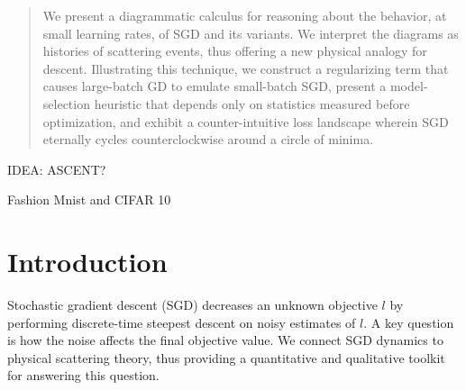 \documentclass{article}
\begin{document}


\printAffiliationsAndNotice{}


\begin{abstract}
    We present a diagrammatic calculus for reasoning about the behavior, at
    small learning rates, of SGD and its variants.  We interpret the diagrams
    as histories of scattering events, thus offering a new physical analogy for
    descent.  Illustrating this technique, we construct a regularizing term
    that causes large-batch GD to emulate small-batch SGD, present a
    model-selection heuristic that depends only on statistics measured before
    optimization, and exhibit a counter-intuitive loss landscape wherein SGD
    eternally cycles counterclockwise around a circle of minima. 
\end{abstract}


IDEA: ASCENT?

Fashion Mnist and CIFAR 10

\section{Introduction}
    Stochastic gradient descent (SGD) decreases an unknown objective $l$ by
    performing discrete-time steepest descent on noisy estimates of $l$.  A key
    question is how the noise affects the final objective value.  We connect
    SGD dynamics to physical scattering theory, thus providing a quantitative
    and qualitative toolkit for answering this question.
\end{document}
